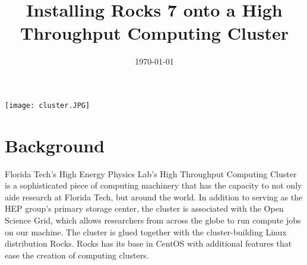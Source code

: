 \documentclass[12pt]{article}
\begin{document}

\title{Installing Rocks 7 onto a High Throughput Computing Cluster}

\date{\today}

\thispagestyle{empty}

\maketitle

\begin{center}
  \texttt{[image: cluster.JPG]}
\end{center}

\thispagestyle{empty}

\newpage



\tableofcontents

\newpage



\section{Background}

\qq Florida Tech's High Energy Physics Lab's High Throughput Computing Cluster
is a sophisticated piece of computing machinery that has the capacity to not
only aide research at Florida Tech, but around the world. In addition to serving
as the HEP group's primary storage center, the cluster is associated with the
Open Science Grid, which allows researchers from across the globe to run compute
jobs on our machine. The cluster is glued together with the cluster-building Linux distribution
Rocks. Rocks has its base in CentOS with additional features that ease the
creation of computing clusters.
\end{document}
